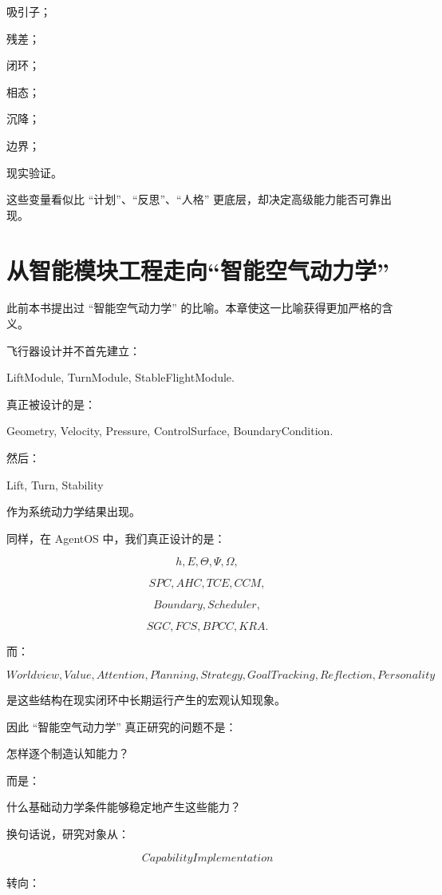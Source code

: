 吸引子；

残差；

闭环；

相态；

沉降；

边界；

现实验证。

这些变量看似比 ``计划''、``反思''、``人格'' 更底层，却决定高级能力能否可靠出现。

\section{从智能模块工程走向“智能空气动力学”}

此前本书提出过 ``智能空气动力学'' 的比喻。本章使这一比喻获得更加严格的含义。

飞行器设计并不首先建立：

LiftModule,
TurnModule,
StableFlightModule.

真正被设计的是：

Geometry,
Velocity,
Pressure,
ControlSurface,
BoundaryCondition.

然后：

Lift,
Turn,
Stability

作为系统动力学结果出现。

同样，在 AgentOS 中，我们真正设计的是：

\[
h,E,\Theta,\Psi,\Omega,
\]

\[
SPC,AHC,TCE,CCM,
\]

\[
Boundary,Scheduler,
\]

\[
SGC,FCS,BPCC,KRA.
\]

而：

\[
Worldview,
Value,
Attention,
Planning,
Strategy,
GoalTracking,
Reflection,
Personality
\]

是这些结构在现实闭环中长期运行产生的宏观认知现象。

因此 ``智能空气动力学'' 真正研究的问题不是：

\begin{statementbox}
怎样逐个制造认知能力？
\end{statementbox}

而是：

\begin{statementbox}
什么基础动力学条件能够稳定地产生这些能力？
\end{statementbox}

换句话说，研究对象从：

\[
CapabilityImplementation
\]

转向：


